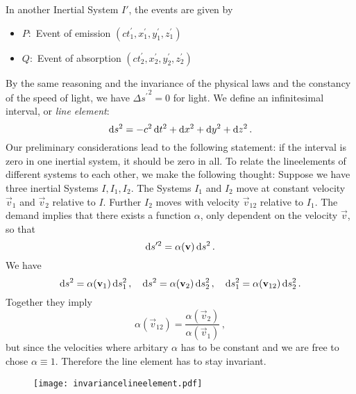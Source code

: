 In another Inertial System $I'$, the events are given by
\begin{itemize}
    \item $P:$ Event of emission $(ct_1^\prime,x_1^\prime,y_1^\prime,z_1^\prime)$
    \item $Q:$ Event of absorption
    $(ct_2^\prime,x_2^\prime,y_2^\prime,z_2^\prime)$
\end{itemize}
By the same reasoning and the invariance of the physical laws and the
constancy of the speed of light, we have ${\Delta s^\prime}^2=0$ for light.
We define an infinitesimal interval, or \emph{line element}:
\begin{equation}
    \dif s^2=-c^2\dif t^2+\dif x^2+\dif y^2+\dif z^2\, .
\end{equation}
Our preliminary considerations lead to the following statement: if the interval
is zero in one inertial system, it should be zero in all.
To relate the lineelements of different systems to each other, we make the
following thought:
Suppose we have three inertial Systems $I,I_1,I_2$.
The Systems $I_1$ and $I_2$ move at constant velocity $\vec{v}_1$ and $\vec{v}_2$ relative to $I$. Further
$I_2$ moves with velocity $\vec{v}_{12}$ relative to $I_1$. The demand implies
that there exists a function $\alpha$, only dependent on the velocity $\vec{v}$,
so that
\begin{equation}
    \dif s'^2=\alpha(\vec{v})\dif s^2\, .
\end{equation}
We have
\begin{equation}
    \dif s^2=\alpha(\vec{v}_1)\dif s_1^2\, ,\quad\dif s^2=\alpha(\vec{v}_2)\dif
    s_2^2\, ,\quad\dif s_1^2=\alpha(\vec{v}_{12})\dif s_2^2\, .
\end{equation}
Together they imply
\begin{equation}
    \alpha(\vec{v}_{12})=\frac{\alpha(\vec{v}_{2})}{\alpha(\vec{v}_{1})}\, ,
\end{equation}
but since the velocities where arbitary $\alpha$ has to be constant and we are
free to chose $\alpha\equiv 1$. Therefore the line element has to stay
invariant.
\begin{figure}[hbtp!]
\centering
 \texttt{[image: invariancelineelement.pdf]}
\caption{}
\end{figure}

